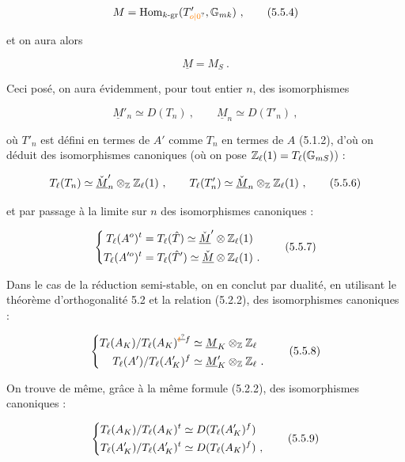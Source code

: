 \[
M=\mathrm{Hom}_{k\text{-}\mathrm{gr}}(T'_{\unsure{o|0}},\mathbb{G}_{mk})\ ,\tag*{(5.5.4)}
\]

et on aura alors

\[
\underline{M}=M_S\ .
\]

Ceci posé, on aura évidemment, pour tout entier $n$, des isomorphismes

\[
\underline{M}'_n\simeq D(T_n)\ ,\qquad \underline{M}_n\simeq D(T'_n)\ ,\tag*{(5.5.5)}
\]

où $T'_n$ est défini en termes de $A'$ comme $T_n$ en termes de $A$ (5.1.2), d'où on déduit des isomorphismes canoniques (où on pose $\mathbb{Z}_{\ell}(1)=T_{\ell}(\mathbb{G}_{mS})$) :

\[
T_{\handwritten{\ell}}(T_n)\simeq\check{\underline{M}}'_n\otimes_{\mathbb{Z}}\mathbb{Z}_{\handwritten{\ell}}(1)\ ,\qquad
T_{\handwritten{\ell}}(T'_n)\simeq\check{\underline{M}}_n\otimes_{\mathbb{Z}}\mathbb{Z}_{\handwritten{\ell}}(1)\ ,\tag*{(5.5.6)}
\]

et par passage à la limite sur $n$ des isomorphismes canoniques :

\[
\handwritten{\left\{}\begin{aligned}
T_{\handwritten{\ell}}(A^o)^t&=T_{\handwritten{\ell}}(\hat{T})\simeq\check{\underline{M}}'\otimes\mathbb{Z}_{\handwritten{\ell}}(1)\\
T_{\handwritten{\ell}}(A^{\prime o})^t&=T_{\handwritten{\ell}}(\hat{T}')\simeq\check{\underline{M}}\otimes\mathbb{Z}_{\handwritten{\ell}}(1)\ .
\end{aligned}\right.\tag*{(5.5.7)}
\]

Dans le cas de la réduction semi-stable, on en conclut par dualité, en utilisant le théorème d'orthogonalité 5.2 et la relation (5.2.2), des isomorphismes canoniques :

\[
\handwritten{\left\{}\begin{aligned}
T_{\handwritten{\ell}}(A_K)/T_{\handwritten{\ell}}(A_K)^{\deleted{\unsure{t}}f}&\simeq\underline{M}_K\otimes_{\mathbb{Z}}\mathbb{Z}_{\handwritten{\ell}}\\
T_{\handwritten{\ell}}(A')/T_{\handwritten{\ell}}(A'_K)^f&\simeq\underline{M}'_K\otimes_{\mathbb{Z}}\mathbb{Z}_{\handwritten{\ell}}\ .
\end{aligned}\right.\tag*{(5.5.8)}
\]

On trouve de même, grâce à la même formule (5.2.2), des isomorphismes canoniques :

\[
\left\{\begin{aligned}
T_{\ell}(A_K)/T_{\ell}(A_K)^t&\simeq D(T_{\ell}(A'_K)^f)\\
T_{\ell}(A'_K)/T_{\ell}(A'_K)^t&\simeq D(T_{\ell}(A_K)^f)\ ,
\end{aligned}\right.\tag*{(5.5.9)}
\]


